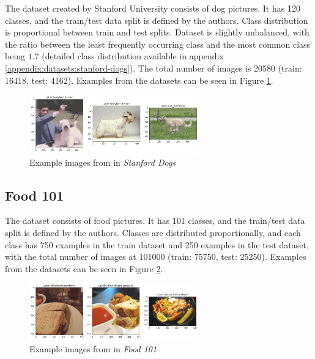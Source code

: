 The dataset created by Stanford University consists of dog pictures. It has 120 classes, and the train/test data split is defined by the authors. Class distribution is proportional between train and test splits. Dataset is slightly unbalanced, with the ratio between the least frequently occurring class and the most common class being $1.7$ (detailed class distribution available in appendix \ref{appendix:datasets:stanford-dogs}). The total number of images is 20580 (train: 16418, test: 4162). Examples from the datasets can be seen in Figure \ref{fig:stanford-dogs-example}.

\begin{figure}[ht]
    \centering
    \includegraphics[width=0.65\textwidth]{experiments/datasets/dogs.png}
    \caption{Example images from in \textit{Stanford Dogs} \cite{stanford-dogs}}\label{fig:stanford-dogs-example}
\end{figure}

\subsection{Food 101}

The dataset consists of food pictures. It has 101 classes, and the train/test data split is defined by the authors. Classes are distributed proportionally, and each class has 750 examples in the train dataset and 250 examples in the test dataset, with the total number of images at 101000 (train: 75750, test: 25250). Examples from the datasets can be seen in Figure \ref{fig:food101-example}.

\begin{figure}[ht]
    \centering
    \includegraphics[width=0.65\textwidth]{experiments/datasets/food101.png}
    \caption{Example images from in \textit{Food 101} \cite{food101}}\label{fig:food101-example}
\end{figure}

